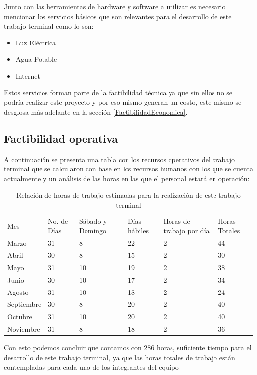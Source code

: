 \documentclass[12pt, a4paper, titlepage]{report}
\begin{document}
\newpage
    	Junto con las herramientas de hardware y software a utilizar es necesario mencionar los servicios básicos que son relevantes para el desarrollo de este trabajo terminal como lo son:
    	\begin{itemize}
    		\item Luz Eléctrica
    		\item Agua Potable
    		\item Internet
    	\end{itemize}
    	Estos servicios forman parte de la factibilidad técnica ya que sin ellos no se podría realizar este proyecto y por eso mismo generan un costo, este mismo se desglosa más adelante en la sección \ref{FactibilidadEconomica}.
    	
    	\subsection{Factibilidad operativa}
    	A continuación se presenta una tabla con los recursos operativos del trabajo terminal que se calcularon con base en los recursos humanos con los que se cuenta actualmente y un análisis de las horas en las que el personal estará en operación:
    	
    	\begin{table}[h!]
    		\caption[Horas de trabajo]{Relación de horas de trabajo estimadas para la realización de este trabajo terminal}
    		\begin{tabular}{|p{2cm}|p{1.4cm}|p{2.2cm}|p{1.6cm}|p{2.2cm}|p{1.6cm}|}
    			\hline    			
    			\rowcolor{guindapoli}
    			\multicolumn{6}{|c|}{\textbf{\textcolor{white}{Horas a trabajar en el desarrollo del trabajo terminal}}}\\
    			\hline
    			Mes & No. de Días & Sábado y Domingo & Días hábiles & Horas de trabajo por día & Horas Totales \\
    			\hline
    			Marzo & 31 & 8 & 22 & 2 & 44 \\ 
    			\hline
    			Abril & 30 & 8 & 15 & 2 & 30 \\ 
    			\hline
    			Mayo & 31 & 10 & 19 & 2 & 38 \\
    			\hline
    			Junio & 30 & 10 & 17 & 2 & 34 \\
    			\hline
    			Agosto & 31 & 10 & 18 & 2 & 24 \\
    			\hline
    			Septiembre & 30 & 8 & 20 & 2 & 40 \\ 
    			\hline
    			Octubre & 31 & 10 & 20 & 2 & 40 \\ 
    			\hline
    			Noviembre & 31 & 8 & 18 & 2 & 36 \\ 
    			\hline
    		\end{tabular}
    	\end{table}
    	Con esto podemos concluir que contamos con 286 horas, suficiente tiempo para el desarrollo de este trabajo terminal, ya que las horas totales de trabajo están contempladas para cada uno de los integrantes del equipo
    	
\end{document}

